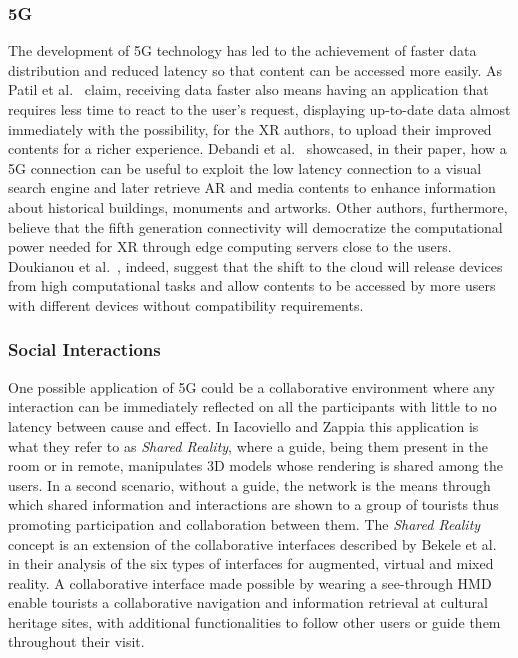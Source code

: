 \subsubsection{5G}
The development of 5G technology has led to the achievement of faster data distribution and reduced latency so that content can be accessed more easily. As Patil et al.~\cite{patil_accelerating_2019} claim, receiving data faster also means having an application that requires less time to react to the user’s request, displaying up-to-date data almost immediately with the possibility, for the XR authors, to upload their improved contents for a richer experience. Debandi et al.~\cite{debandi_enhancing_2018} showcased, in their paper, how a 5G connection can be useful to exploit the low latency connection to a visual search engine and later retrieve AR and media contents to enhance information about historical buildings, monuments and artworks.
Other authors, furthermore, believe that the fifth generation connectivity will democratize the computational power needed for XR through edge computing servers close to the users. Doukianou et al.~\cite{doukianou_beyond_2020}, indeed, suggest that the shift to the cloud will release devices from high computational tasks and allow contents to be accessed by more users with different devices without compatibility requirements.

\subsubsection{Social Interactions}
One possible application of 5G could be a collaborative environment where any interaction can be immediately reflected on all the participants with little to no latency between cause and effect. In Iacoviello and Zappia \cite{iacoviello_holocities_2020} this application is what they refer to as \textit{Shared Reality}, where a guide, being them present in the room or in remote, manipulates 3D models whose rendering is shared among the users. In a second scenario, without a guide, the network is the means through which shared information and interactions are shown to a group of tourists thus promoting participation and collaboration between them. The \textit{Shared Reality} concept is an extension of the collaborative interfaces described by Bekele et al.~\cite{bekele_survey_2018} in their analysis of the six types of interfaces for augmented, virtual and mixed reality. A collaborative interface made possible by wearing a see-through HMD enable tourists a collaborative navigation and information retrieval at cultural heritage sites, with additional functionalities to follow other users or guide them throughout their visit.

